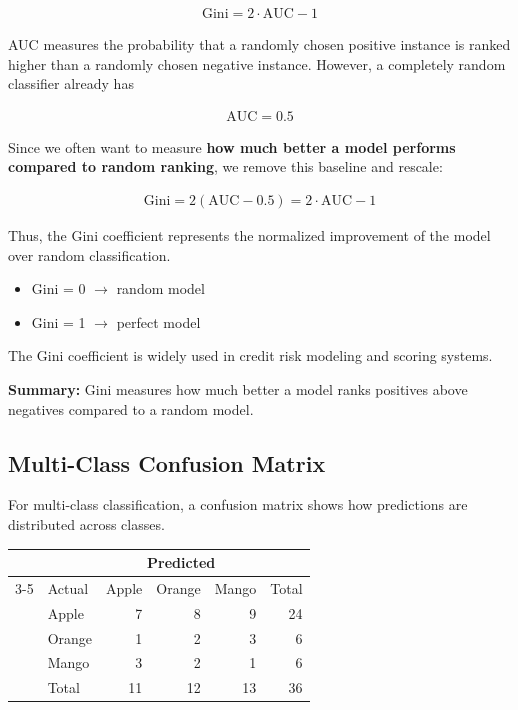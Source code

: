 \documentclass[10pt,a4paper]{article}
\begin{document}
	\begin{align*}
			\text{Gini} = 2 \cdot \text{AUC} - 1
	\end{align*}


	AUC measures the probability that a randomly chosen positive instance is ranked higher than a randomly chosen negative instance.
	However, a completely random classifier already has

	\begin{align*}
		\text{AUC} = 0.5
	\end{align*}

	Since we often want to measure \textbf{how much better a model performs compared to random ranking}, we remove this baseline and rescale:

	\begin{align*}
		\text{Gini} = 2(\text{AUC} - 0.5) = 2\cdot \text{AUC} - 1
	\end{align*}

	Thus, the Gini coefficient represents the normalized improvement of the model over random classification.


	\begin{itemize}
		\item Gini = 0 $\rightarrow$ random model
		\item Gini = 1 $\rightarrow$ perfect model
	\end{itemize}

	The Gini coefficient is widely used in credit risk modeling and scoring systems.

	\textbf{Summary:} Gini measures how much better a model ranks positives above negatives compared to a random model.

	\subsection{Multi-Class Confusion Matrix}

	For multi-class classification, a confusion matrix shows how predictions are distributed across classes.

	\begin{center}
		\begin{tabular}{llrrrr}
			\toprule
			& & \multicolumn{3}{c}{Predicted} &  \\
			\cmidrule(lr){3-5}
			& Actual & Apple & Orange & Mango & Total \\
			\midrule
			& Apple  & 7 & 8 & 9 & 24 \\
			& Orange & 1 & 2 & 3 & 6 \\
			& Mango  & 3 & 2 & 1 & 6 \\
			\midrule
			& Total  & 11 & 12 & 13 & 36 \\
			\bottomrule
		\end{tabular}
	\end{center}
\end{document}
